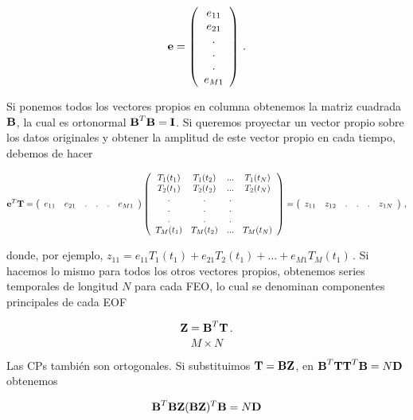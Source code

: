 \documentclass[
]{agujournal2019}
\begin{document}
\[{\textbf e}=\left(\begin{array}{c}
   e_{11} \\
   e_{21} \\
         .\\
         .\\
     .\\
   e_{M1} \\
        \end{array}\right)\,.\]

Si ponemos todos los vectores propios en columna obtenemos la matriz
cuadrada \({\textbf B}\), la cual es ortonormal
\({\textbf B}^T{\textbf B}={\textbf I}\). Si queremos proyectar un
vector propio sobre los datos originales y obtener la amplitud de este
vector propio en cada tiempo, debemos de hacer

\[{\textbf e}^T{\textbf T}=\left(\begin{array}{ccccccc}
   e_{11} &
   e_{21} & . & . & . & e_{M1} \\
        \end{array}\right)
    \left(\begin{array}{cccc}
   T_{1}(t_1) & T_{1}(t_2) & ... & T_{1}(t_N)\\
   T_{2}(t_1) & T_{2}(t_2) & ... & T_{2}(t_N)\\
                . & . & . \\
        . & . & . \\
        . & . & . \\
   T_{M}(t_1) & T_{M}(t_2) & ... & T_{M}(t_N)\\
        \end{array}\right)=
    \left(\begin{array}{ccccccc}
   z_{11} &
   z_{12} & . & . & . & z_{1N} \\
        \end{array}\right)\,,\]

donde, por ejemplo,
\(z_{11}=e_{11}T_1(t_1)+ e_{21}T_2(t_1) + ... + e_{M1}T_M(t_1)\,.\) Si
hacemos lo mismo para todos los otros vectores propios, obtenemos series
temporales de longitud \(N\) para cada FEO, lo cual se denominan
componentes principales de cada EOF

\[{\textbf Z}={\textbf B}^T{\textbf T}\,.\] \[M\times N\]

Las CPs también son ortogonales. Si substituimos
\({\textbf T}={\textbf B}{\textbf Z}\), en
\({\textbf B}^T{\textbf T}{\textbf T}^T{\textbf B}=N{\textbf D}\)
obtenemos

\[{\textbf B}^T{\textbf B}{\textbf Z}({\textbf B}{\textbf Z})^T{\textbf B}=N{\textbf D}\]
\end{document}
